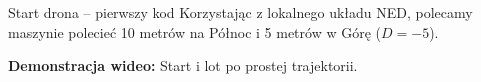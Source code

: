 \begin{frame}{Start drona -- pierwszy kod}
    Korzystając z lokalnego układu NED, polecamy maszynie polecieć 10 metrów na Północ i 5 metrów w Górę ($D = -5$).
    
    \vspace{0.5cm}
    \textbf{Demonstracja wideo:} Start i lot po prostej trajektorii.
    
    \begin{center}
    \end{center}
\end{frame}
